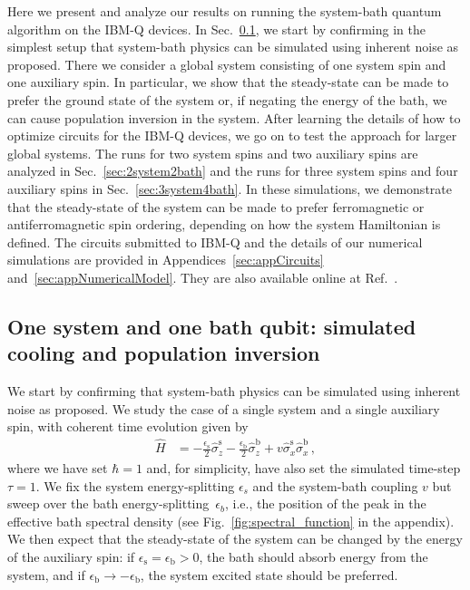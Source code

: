 \documentclass[twocolumn,amsmath,amssymb,pra]{revtex4-2}
\begin{document}
Here we present and analyze our results on running the system-bath quantum algorithm on the IBM-Q devices.
In Sec.~\ref{sec:1system1bath}, we start by confirming in the simplest setup
that system-bath physics can be simulated using inherent noise as proposed.
There we consider a global system consisting of one system spin and one auxiliary spin.
In particular,
we show that the steady-state can be made to prefer the ground state of the system or,
if negating the energy of the bath, we can cause population inversion in the system.
After learning the details of how to optimize circuits for the IBM-Q devices,
we go on to test the approach for larger global systems.
The runs for two system spins and two auxiliary spins are analyzed in Sec.~\ref{sec:2system2bath} and
the runs for three system spins and four auxiliary spins in Sec.~\ref{sec:3system4bath}.
In these simulations, we demonstrate that
the steady-state of the system can be made to prefer ferromagnetic or antiferromagnetic spin ordering,
depending on how the system Hamiltonian is defined.
The circuits submitted to IBM-Q and the details of our numerical simulations
are provided in Appendices~\ref{sec:appCircuits} and~\ref{sec:appNumericalModel}.
They are also available online at Ref.~\cite{qoqo_files_online}.

\subsection{One system and one bath qubit: simulated cooling and population inversion}\label{sec:1system1bath}
We start by confirming that system-bath physics can be simulated using inherent noise as proposed.
We study the case of a single system and a single auxiliary spin,
with coherent time evolution given by
\begin{align}
\hat H &= -\frac{\epsilon_\textrm{s}}{2}\hat\sigma_z^{\textrm{s}} - \frac{\epsilon_\textrm{b}}{2}\hat\sigma_z^{\textrm{b}} + v\hat\sigma_x^{\textrm{s}}\hat\sigma_x^{\textrm{b}} \, ,
\end{align}
where we have set $\hbar=1$ and, for simplicity, have also set the simulated time-step $\tau=1$.
We fix the system energy-splitting $\epsilon_{s}$ and the system-bath coupling $v$
but sweep over the bath energy-splitting~$\epsilon_{b}$, i.e.,
the position of the peak in the effective bath spectral density (see Fig.~\ref{fig:spectral_function} in the appendix).
We then expect that the steady-state of the system can be changed by the energy of the auxiliary spin:
if $\epsilon_\textrm{s}=\epsilon_\textrm{b}>0$, the bath should absorb energy from the system,
and if $\epsilon_\textrm{b}\rightarrow-\epsilon_\textrm{b}$,
the system excited state should be preferred.
\end{document}
